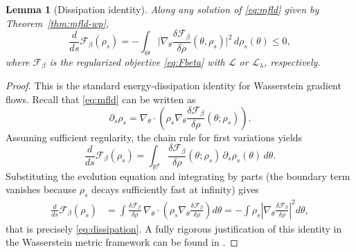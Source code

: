 \documentclass[11pt,a4wide]{article}
\newtheorem{lemma}[theorem]{Lemma}
\theoremstyle{definition}
\begin{document}
\begin{lemma}[Dissipation identity]
\label{lem:dissipation}
Along any solution of \eqref{eq:mfld} given by Theorem~\ref{thm:mfld-wp},
\begin{equation}
\frac{d}{ds}\mathcal F_\beta(\rho_s) = -\int_\Theta \Big|\nabla_\theta\frac{\delta\mathcal F_\beta}{\delta\rho}(\theta,\rho_s)\Big|^2\,d\rho_s(\theta) \le 0,
\label{eq:dissipation}
\end{equation}
where $\mathcal F_\beta$ is the regularized objective \eqref{eq:Fbeta}  with $\mathcal L$ or  $\mathcal L_\lambda$, respectively.
\end{lemma}
\begin{proof}

This is the standard energy-dissipation identity for Wasserstein gradient flows. Recall that \eqref{eq:mfld} can be written as
\[
\partial_s\rho_s
=
\nabla_\theta\cdot
\left(
\rho_s
\nabla_\theta
\frac{\delta\mathcal F_\beta}{\delta\rho}
(\theta; \rho_s)
\right).
\]
Assuming sufficient regularity, the chain rule for first variations yields
\[
\frac{d}{ds}\mathcal F_\beta(\rho_s)
=
\int_{\mathbb R^p}
\frac{\delta\mathcal F_\beta}{\delta\rho}
(\theta;\rho_s)
\,\partial_s\rho_s(\theta)
\,d\theta.
\]
Substituting the evolution equation and integrating by parts (the boundary term vanishes because $\rho_s$ decays sufficiently fast at infinity) gives
\[
\begin{aligned}
\frac{d}{ds}\mathcal F_\beta(\rho_s)
&=
\int
\frac{\delta\mathcal F_\beta}{\delta\rho}
\,\nabla_\theta\!\cdot
\left(
\rho_s
\nabla_\theta
\frac{\delta\mathcal F_\beta}{\delta\rho}
\right)
d\theta
=
-
\int
\rho_s
\left|
\nabla_\theta
\frac{\delta\mathcal F_\beta}{\delta\rho}
\right|^2
d\theta,
\end{aligned}
\]
that is precisely \eqref{eq:dissipation}. A fully rigorous justification of this identity in the Wasserstein metric framework can be found in \cite[Chapter~8]{ambrosio2008gradient}.
\end{proof}
\end{document}
